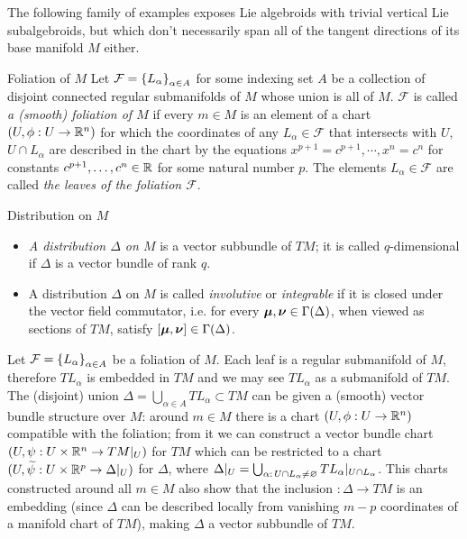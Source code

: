 The following family of examples exposes Lie algebroids with trivial vertical Lie subalgebroids, but which don't necessarily span all of the tangent directions of its base manifold $M$ either.

\begin{definition} {Foliation of $M$}
Let $\mathcal F = \left\{ L_\alpha \right\}_{\alpha \in A}$ for some indexing set $A$ be a collection of disjoint connected regular submanifolds of $M$ whose union is all of $M$. $\mathcal F$ is called \emph{a %
(smooth) foliation of $M$} if every $m \in M$ is an element of a chart $(U, \phi:U \to \RR^n)$ for which the coordinates of any $L_\alpha \in \mathcal F$ that intersects with $U$, $U \cap L_\alpha$ are described in the chart by the equations $x^{p+1} = c^{p+1}, \cdots , x^{n} = c^{n} $ for constants $c^{p+1}, \dots, c^n \in \mathbb{R}$ for some natural number $p$. The elements $L_\alpha \in \mathcal F$ are called \emph{the leaves of the foliation $\mathcal F$}.
\end{definition}

\begin{definition}{Distribution on $M$}
\begin{itemize}
    \item \emph{A distribution $\Delta$ on $M$} is a vector subbundle of $TM$; it is called $q$-dimensional if $\Delta$ is a vector bundle of rank $q$.
    
    \item A distribution $\Delta$ on $M$ is called \emph{involutive} or \emph{integrable} if it is closed under the vector field commutator, i.e. for every $\bm{\mu}, \bm{\nu} \in \Gamma(\Delta)$, when viewed as sections of $TM$, satisfy $[\bm{\mu}, \bm{\nu}] \in \Gamma(\Delta)$.
\end{itemize}
\end{definition}

Let $\mathcal F = \left\{ L_\alpha \right\}_{\alpha \in A}$ be a foliation of $M$. Each leaf is a regular submanifold of $M$, therefore $T L_\alpha$ is embedded in $TM$ and we may see $T L_\alpha$ as a submanifold of $TM$. The (disjoint) union $\Delta = \bigcup_{\alpha \in A} T L_\alpha \subset TM$ can be given a (smooth) vector bundle structure over $M$: around $m \in M$ there is a chart $(U, \phi:U \to \RR^n)$ compatible with the foliation; from it we can construct a vector bundle chart $(U, \psi: U \times \mathbb{R}^n \to TM|_{U})$ for $TM$ which can be restricted to a chart $(U, \widetilde{\psi}: U \times \mathbb{R}^p \to \Delta|_{U})$ for $\Delta$, where $\Delta|_U = \bigcup_{\alpha: \, U \cap L_\alpha \neq \varnothing} T L_\alpha|_{U\cap L_\alpha}$. This charts constructed around all $m\in M$ also show that the inclusion $:\Delta \to TM$ is an embedding (since $\Delta$ can be described locally from vanishing $m-p$ coordinates of a manifold chart of $TM$), making $\Delta$ a vector subbundle of $TM$.

